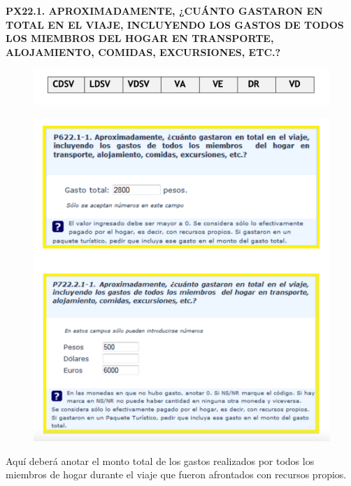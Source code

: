 \documentclass[
  openany]{book}
\begin{document}
\textbf{PX22.1. APROXIMADAMENTE, ¿CUÁNTO GASTARON EN TOTAL EN EL VIAJE, INCLUYENDO LOS GASTOS DE TODOS LOS MIEMBROS DEL HOGAR EN TRANSPORTE, ALOJAMIENTO, COMIDAS, EXCURSIONES, ETC.?}

\begin{figure}

{\centering \includegraphics[width=1\linewidth]{imagenes/figura6-123} 

}

\end{figure}

\begin{figure}

{\centering \includegraphics[width=1\linewidth]{imagenes/figura6-124} 

}

\end{figure}

Aquí deberá anotar el monto total de los gastos realizados por todos los miembros de hogar durante el viaje que fueron afrontados con recursos propios.
\end{document}
